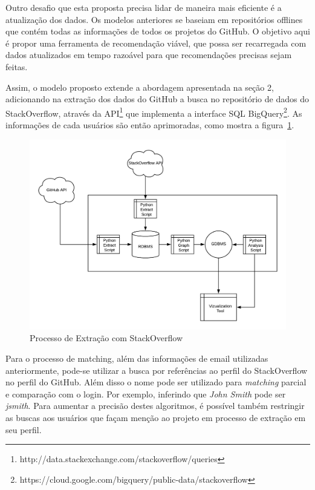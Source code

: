 \documentclass[a4paper,12pt]{monografia}
\theoremstyle{plain}
\theoremstyle{definition}
\theoremstyle{remark}
\begin{document}
Outro desafio que esta proposta precisa lidar de maneira mais eficiente é a atualização dos dados. Os modelos anteriores se baseiam em repositórios offlines que contém todas as informações de todos os projetos do GitHub. O objetivo aqui é propor uma ferramenta de recomendação viável, que possa ser recarregada com dados atualizados em tempo razoável para que recomendações precisas sejam feitas.

Assim, o modelo proposto extende a abordagem apresentada na seção 2, adicionando na extração dos dados do GitHub a busca no repositório de dados do StackOverflow, através da API\footnote{http://data.stackexchange.com/stackoverflow/queries} que implementa a interface SQL BigQuery\footnote{https://cloud.google.com/bigquery/public-data/stackoverflow}. As informações de cada usuários são então aprimoradas, como mostra a figura~\ref{fig:processo_extracao_stackoverflow}.


\begin{figure}[!htbp]
 \includegraphics[width=\textwidth]{processo_extracao_stackoverflow}
 \caption{Processo de Extração com StackOverflow}\label{fig:processo_extracao_stackoverflow}
\end{figure}

Para o processo de matching, além das informações de email utilizadas anteriormente, pode-se utilizar a busca por referências ao perfil do StackOverflow no perfil do GitHub. Além disso o nome pode ser utilizado para \textit{matching} parcial e comparação com o login. Por exemplo, inferindo que \textit{John Smith} pode ser \textit{jsmith}. Para aumentar a precisão destes algoritmos, é possível também restringir as buscas aos usuários que façam menção ao projeto em processo de extração em seu perfil.
\end{document}
